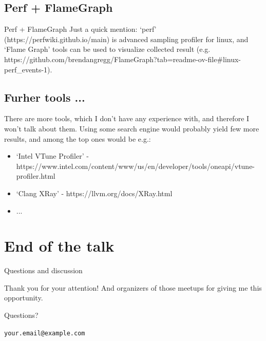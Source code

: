 \documentclass[aspectratio=169]{beamer}
\begin{document}
\subsection{Perf + FlameGraph}

\begin{frame}{Perf + FlameGraph}
    Just a quick mention: `perf' (https://perfwiki.github.io/main) is advanced sampling profiler for linux, and `Flame Graph' tools can be used to visualize collected result (e.g. https://github.com/brendangregg/FlameGraph?tab=readme-ov-file\#linux-perf\_events-1).

\end{frame}


\subsection{Furher tools ...}

\begin{frame}
    There are more tools, which I don't have any experience with, and therefore I won't talk about them. Using some search engine would probably yield few more results, and among the top ones would be e.g.:

    \begin{itemize}
        \item `Intel VTune Profiler' - https://www.intel.com/content/www/us/en/developer/tools/oneapi/vtune-profiler.html
        \item `Clang XRay' - https://llvm.org/docs/XRay.html
        \item ...
    \end{itemize}

\end{frame}



\section{End of the talk}

\begin{frame}{Questions and discussion}
    \begin{center}
        \Large Thank you for your attention! And organizers of those meetups for giving me this opportunity.

        \vspace{1cm}

        Questions?

        \vspace{1cm}

        \texttt{your.email@example.com}

    \end{center}

\end{frame}
\end{document}
